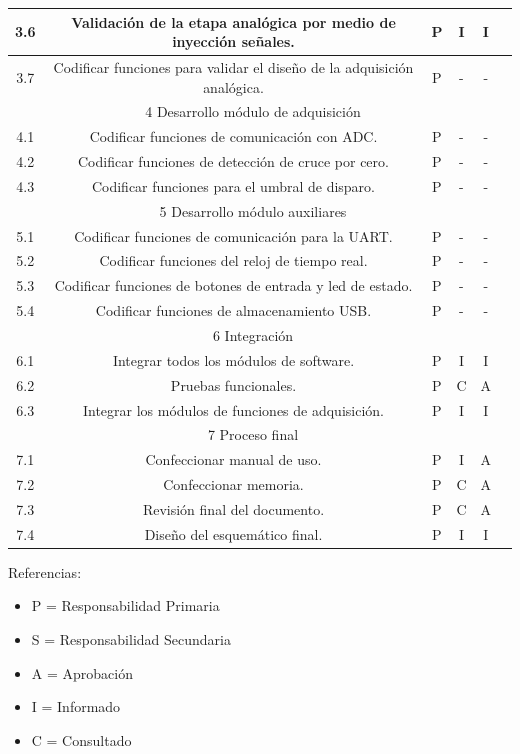 \documentclass[11pt]{charter}
\begin{document}
\begin{table}[H]
{\begin{tabular}{|c|c|c|c|c|c|}
3.6 & Validación de la etapa analógica por medio de inyección señales. & P & I & I   \\ \hline
3.7 & Codificar funciones para validar el diseño de la adquisición analógica. & P & - & -  \\ \hline
\multicolumn{5}{|c|}{\cellcolor[HTML]{FF3333}4 Desarrollo módulo de adquisición} \\ \hline
4.1 & Codificar funciones de comunicación con ADC. & P & - & -   \\ \hline
4.2 & Codificar funciones de detección de cruce por cero. & P & - & -   \\ \hline
4.3 & Codificar funciones para el umbral de disparo. & P & - & -   \\ \hline
\multicolumn{5}{|c|}{\cellcolor[HTML]{FFFF00}5 Desarrollo módulo auxiliares} \\ \hline
5.1 & Codificar funciones de comunicación para la UART. & P & - & -   \\ \hline
5.2 & Codificar funciones del reloj de tiempo real. & P & - & -  \\ \hline
5.3 & Codificar funciones de botones de entrada y led de estado. & P & - & -   \\ \hline
5.4 & Codificar funciones de almacenamiento USB. & P & - & -   \\ \hline
\multicolumn{5}{|c|}{\cellcolor[HTML]{66CC00}6 Integración} \\ \hline
6.1 & Integrar todos los módulos de software. & P & I & I   \\ \hline
6.2 & Pruebas funcionales. & P & C & A  \\ \hline
6.3 & Integrar los módulos de funciones de adquisición. & P & I & I  \\ \hline
\multicolumn{5}{|c|}{\cellcolor[HTML]{EA6B66}7 Proceso final} \\ \hline
7.1 & Confeccionar manual de uso. & P & I & A   \\ \hline
7.2 & Confeccionar memoria. & P & C & A   \\ \hline
7.3 & Revisión final del documento. & P & C & A   \\ \hline
7.4 & Diseño del esquemático final. & P & I & I   \\ \hline  
\end{tabular}%
}
\end{table}

{\footnotesize
Referencias:
\begin{itemize}
	\item P = Responsabilidad Primaria
	\item S = Responsabilidad Secundaria
	\item A = Aprobación
	\item I = Informado
	\item C = Consultado
\end{itemize}
} %
\end{document}
